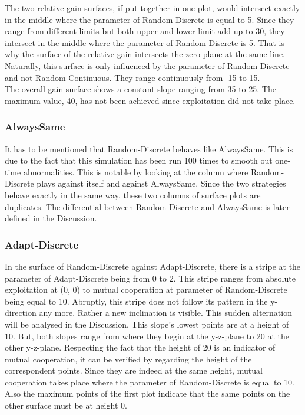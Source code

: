 \documentclass[11pt]{article}
\begin{document}
		The two relative-gain surfaces, if put together in one plot, would intersect exactly in the middle where the parameter of Random-Discrete is equal to 5.
		Since they range from different limits but both upper and lower limit add up to 30, they intersect in the middle where the parameter of Random-Discrete is 5.
		That is why the surface of the relative-gain intersects the zero-plane at the same line.
		Naturally, this surface is only influenced by the parameter of Random-Discrete and not Random-Continuous.
		They range continuously from -15 to 15.\\

		The overall-gain surface shows a constant slope ranging from 35 to 25.
		The maximum value, 40, has not been achieved since exploitation did not take place.\\


\subsubsection*{AlwaysSame}
		It has to be mentioned that Random-Discrete behaves like AlwaysSame.
		This is due to the fact that this simulation has been run 100 times to smooth out one-time abnormalities.
		This is notable by looking at the column where Random-Discrete plays against itself and against AlwaysSame.
		Since the two strategies behave exactly in the same way, these two columns of surface plots are duplicates.
		The differential between Random-Discrete and AlwaysSame is later defined in the Discussion.\\


\subsubsection*{Adapt-Discrete}
		In the surface of Random-Discrete against Adapt-Discrete, there is a stripe at the parameter of Adapt-Discrete being from 0 to 2.
		This stripe ranges from absolute exploitation at (0, 0) to mutual cooperation at parameter of Random-Discrete being equal to 10.
		Abruptly, this stripe does not follow its pattern in the y-direction any more.
		Rather a new inclination is visible.
		This sudden alternation will be analysed in the Discussion. 
		This slope's lowest points are at a height of 10.
		But, both slopes range from where they begin at the y-z-plane to 20 at the other y-z-plane.
		Respecting the fact that the height of 20 is an indicator of mutual cooperation, it can be verified by regarding the height of the correspondent points.
		Since they are indeed at the same height, mutual cooperation takes place where the parameter of Random-Discrete is equal to 10.
		Also the maximum points of the first plot indicate that the same points on the other surface must be at height 0.\\
\end{document}
